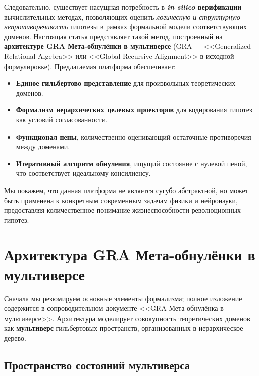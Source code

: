\documentclass[11pt,a4paper]{article}
\begin{document}
Следовательно, существует насущная потребность в \textbf{\emph{in silico} верификации} — вычислительных методах, позволяющих оценить \emph{логическую и структурную непротиворечивость} гипотезы в рамках формальной модели соответствующих доменов. Настоящая статья представляет такой метод, построенный на \textbf{архитектуре GRA Мета-обнулёнки в мультиверсе} (GRA — <<Generalized Relational Algebra>> или <<Global Recursive Alignment>> в исходной формулировке). Предлагаемая платформа обеспечивает:
\begin{itemize}
    \item \textbf{Единое гильбертово представление} для произвольных теоретических доменов.
    \item \textbf{Формализм иерархических целевых проекторов} для кодирования гипотез как условий согласованности.
    \item \textbf{Функционал пены}, количественно оценивающий остаточные противоречия между доменами.
    \item \textbf{Итеративный алгоритм обнуления}, ищущий состояние с нулевой пеной, что соответствует идеальному консилиенсу.
\end{itemize}

Мы покажем, что данная платформа не является сугубо абстрактной, но может быть применена к конкретным современным задачам физики и нейронауки, предоставляя количественное понимание жизнеспособности революционных гипотез.

\section{Архитектура GRA Мета-обнулёнки в мультиверсе}

Сначала мы резюмируем основные элементы формализма; полное изложение содержится в сопроводительном документе <<GRA Мета-обнулёнка в мультиверсе>>. Архитектура моделирует совокупность теоретических доменов как \textbf{мультиверс} гильбертовых пространств, организованных в иерархическое дерево.

\subsection{Пространство состояний мультиверса}
\end{document}
